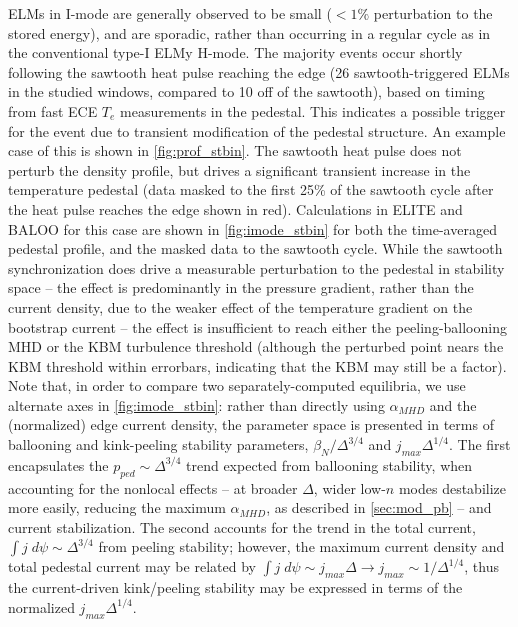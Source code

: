 ELMs in I-mode are generally observed to be small ($<1\%$ perturbation to the stored energy), and are sporadic, rather than occurring in a regular cycle as in the conventional type-I ELMy H-mode.  The majority events occur shortly following the sawtooth heat pulse reaching the edge (26 sawtooth-triggered ELMs in the studied windows, compared to 10 off of the sawtooth), based on timing from fast ECE $T_e$ measurements in the pedestal.  This indicates a possible trigger for the event due to transient modification of the pedestal structure.  An example case of this is shown in \cref{fig:prof_stbin}.  The sawtooth heat pulse does not perturb the density profile, but drives a significant transient increase in the temperature pedestal (data masked to the first 25\% of the sawtooth cycle after the heat pulse reaches the edge shown in red).  Calculations in ELITE and BALOO for this case are shown in \cref{fig:imode_stbin} for both the time-averaged pedestal profile, and the masked data to the sawtooth cycle.  While the sawtooth synchronization does drive a measurable perturbation to the pedestal in stability space -- the effect is predominantly in the pressure gradient, rather than the current density, due to the weaker effect of the temperature gradient on the bootstrap current -- the effect is insufficient to reach either the peeling-ballooning MHD or the KBM turbulence threshold (although the perturbed point nears the KBM threshold within errorbars, indicating that the KBM may still be a factor).  Note that, in order to compare two separately-computed equilibria, we use alternate axes in \cref{fig:imode_stbin}: rather than directly using $\alpha_{MHD}$ and the (normalized) edge current density, the parameter space is presented in terms of ballooning and kink-peeling stability parameters, $\beta_N/\Delta^{3/4}$ and $j_{max} \Delta^{1/4}$.  The first encapsulates the $p_{ped} \sim \Delta^{3/4}$ trend expected from ballooning stability, when accounting for the nonlocal effects -- at broader $\Delta$, wider low-$n$ modes destabilize more easily, reducing the maximum $\alpha_{MHD}$, as described in \cref{sec:mod_pb} -- and current stabilization.  The second accounts for the trend in the total current, $\int j \;d\psi \sim \Delta^{3/4}$ from peeling stability; however, the maximum current density and total pedestal current may be related by $\int j \; d\psi \sim j_{max} \Delta \rightarrow j_{max} \sim 1/\Delta^{1/4}$, thus the current-driven kink/peeling stability may be expressed in terms of the normalized $j_{max} \Delta^{1/4}$.

